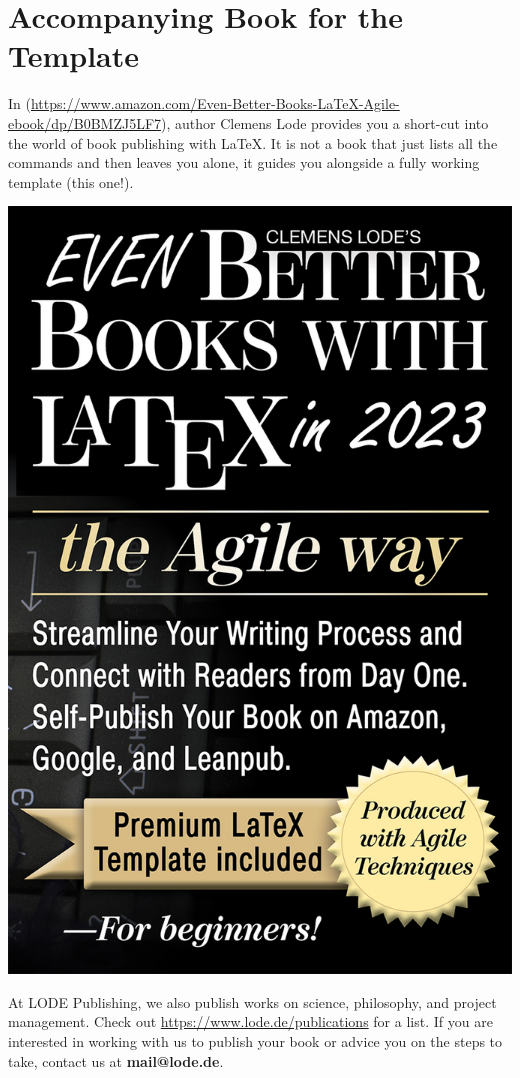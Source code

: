 

\chapter{Accompanying Book for the Template}\label{additional-titles:sec}


In \ifxetex\else{} \citep{eBBWLtAW}\fi (\url{https://www.amazon.com/Even-Better-Books-LaTeX-Agile-ebook/dp/B0BMZJ5LF7}), author Clemens Lode provides you a short-cut into the world of book publishing with LaTeX. It is not a book that just lists all the commands and then leaves you alone, it guides you alongside a fully working template (this one!).

\begin{center}
\includegraphics[width=.45\textwidth]{images/cover.jpg}
\end{center}

At LODE Publishing, we also publish works on science, philosophy, and project management. Check out \url{https://www.lode.de/publications} for a list. If you are interested in working with us to publish your book or advice you on the steps to take, contact us at \textbf{mail@lode.de}.